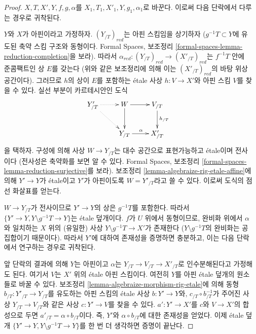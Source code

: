 \begin{proof}
\noindent
$X, \allowbreak T, \allowbreak X', \allowbreak Y, \allowbreak f,
\allowbreak g, \allowbreak \alpha$를
$X_1, \allowbreak T_1, \allowbreak X'_1, \allowbreak Y,
\allowbreak g_1, \allowbreak \alpha_1$로 바꾼다.
이로써 다음 단락에서 다루는 경우로 귀착된다.

\medskip\noindent
$Y$와 $X$가 아핀이라고 가정하자.
$(Y_{/T})_{red}$는 아핀 스킴임을 상기하자
($g^{-1}T \subset Y$에 유도된 축약 스킴 구조와 동형이다.
Formal Spaces, 보조정리
\ref{formal-spaces-lemma-reduction-completion}을 보라).
따라서 $\alpha_{red} : (Y_{/T})_{red} \to (X'_{/T})_{red}$는
$f^{-1}T$ 안에 준콤팩트인 상 $E$를 갖는다
(위와 같은 보조정리에 의해 이는 $(X'_{/T})_{red}$의
바탕 위상공간이다).
그러므로 $h$의 상이 $E$를 포함하는 \'etale 사상
$h : V \to X'$와 아핀 스킴 $V$를 찾을 수 있다.
실선 부분이 카르테시안인 도식
$$
\xymatrix{
Y'_{/T} \ar@{..>}[rd] \ar@{..>}[r] &
W \ar[d] \ar[r] & V_{/T} \ar[d]^{h_{/T}} \\
& Y_{/T} \ar[r]^\alpha & X'_{/T}
}
$$
을 택하자. 구성에 의해 사상 $W \to Y_{/T}$는
대수 공간으로 표현가능하고 \'etale이며 전사이다
(전사성은 축약화를 보면 알 수 있다. Formal Spaces, 보조정리
\ref{formal-spaces-lemma-reduction-surjective}를 보라).
보조정리 \ref{lemma-algebraize-rig-etale-affine}에 의해
$Y' \to Y$가 \'etale이고 $Y'$가 아핀이도록
$W = Y'_{/T}$라고 쓸 수 있다. 이로써 도식의 점선 화살표를 얻는다.

$W \to Y_{/T}$가 전사이므로 $Y' \to Y$의 상은 $g^{-1}T$를 포함한다.
따라서 $\{Y' \to Y, Y \setminus g^{-1}T \to Y\}$는
\'etale 덮개이다. $f$가 $U$ 위에서 동형이므로,
완비화 위에서 $\alpha$와 일치하는 $X$ 위의 (유일한) 사상
$Y \setminus g^{-1}T \to X'$가 존재한다
($Y \setminus g^{-1}T$의 완비화는 공집합이기 때문이다).
따라서 $Y'$에 대하여 존재성을 증명하면 충분하고,
이는 다음 단락에서 연구하는 경우로 귀착된다.

\medskip\noindent
앞 단락의 결과에 의해 $Y$는 아핀이고
$\alpha$는 $Y_{/T} \to V_{/T} \to X'_{/T}$로 인수분해된다고
가정해도 된다. 여기서 $V$는 $X'$ 위의 \'etale 아핀 스킴이다.
여전히 $Y$를 아핀 \'etale 덮개의 원소들로 바꿀 수 있다.
보조정리 \ref{lemma-algebraize-morphism-rig-etale}에 의해
동형 $b_{/T} : Y'_{/T} \to Y_{/T}$를 유도하는 아핀 스킴의
\'etale 사상 $b : Y' \to Y$와,
$c_{/T} \circ b_{/T}^{-1}$가 주어진 사상
$Y_{/T} \to V_{/T}$와 같은 사상 $c : Y' \to V$를 찾을 수 있다.
$a' : Y' \to X'$를 $c$와 $V \to X'$의 합성으로 두면
$a'_{/T} = \alpha \circ b_{/T}$이다. 즉,
$Y'$와 $\alpha \circ b_{/T}$에 대한 존재성을 얻었다.
이제 \'etale 덮개
$\{Y' \to Y, Y \setminus g^{-1}T \to Y\}$를
한 번 더 생각하면 증명이 끝난다.
\end{proof}

